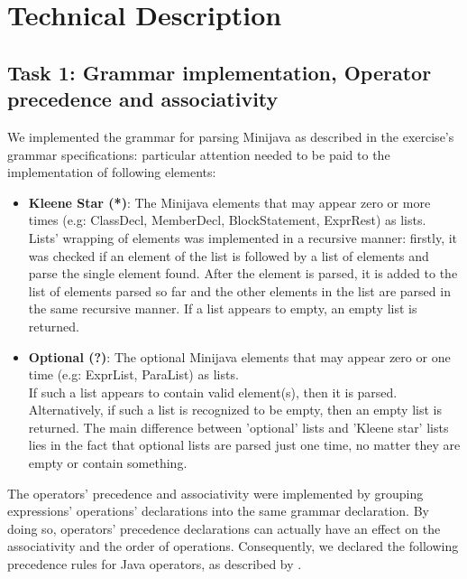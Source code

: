 \documentclass[paper=a4, fontsize=11pt]{scrartcl}
\numberwithin{equation}{section}		%
\numberwithin{figure}{section}			%
\numberwithin{table}{section}				%
\begin{document}
\section*{Technical Description}

\subsection*{Task 1: Grammar implementation, Operator precedence and associativity }
\label{Task1}

We implemented the grammar for parsing Minijava as described in the exercise's grammar specifications: particular attention needed to be paid to the implementation of following elements: 
\begin{itemize}
	\item \textbf{Kleene Star (*)}: The Minijava elements  that may appear zero or more times (e.g: ClassDecl, MemberDecl, BlockStatement, ExprRest) as lists. \\
	Lists' wrapping of elements was implemented in a recursive manner: firstly, it was checked if an element of the list is followed by a list of elements and parse the single element found.  After the element is parsed, it is added to the list of elements parsed so far and the other elements in the list are parsed in the same recursive manner. If a list appears to empty, an empty list is returned. 
	\item \textbf{Optional (?)}: The optional Minijava elements that may appear zero or one time (e.g: ExprList, ParaList) as lists. \\
	If such a list appears to contain valid element(s), then it is parsed. Alternatively, if such a list is recognized to be empty, then an empty list is returned. The main difference between 'optional' lists and 'Kleene star' lists lies in the fact that optional lists are parsed just one time, no matter they are empty or contain something. 
\end{itemize}

The operators' precedence and associativity were implemented by grouping expressions' operations' declarations into the same grammar declaration. By doing so, operators' precedence declarations can actually have an effect on the associativity and the order of operations. Consequently, we declared the following precedence rules for Java operators, as described by \cite{Princeton}.
\end{document}
